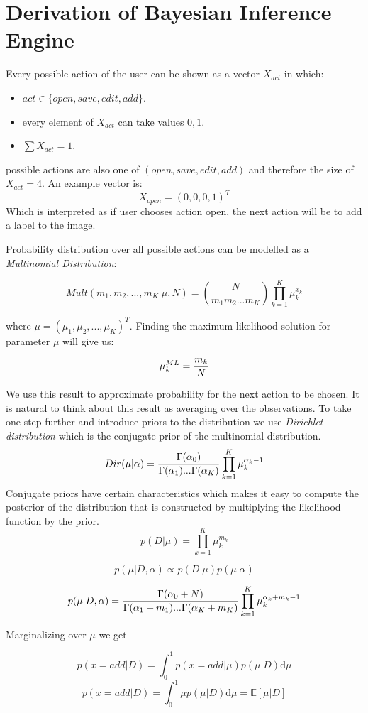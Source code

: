 \section{ Derivation of Bayesian Inference Engine}
Every possible action of the user can be shown as a vector $X_{act}$ in which:
\begin{itemize}
\item $act \in \{open, save, edit, add\}$.
\item every element of $X_{act}$ can take values $0,1$.
\item $\sum X_{act} =1$. 
\end{itemize}

possible actions are also one of $(open, save, edit, add)$ and therefore the size of $X_{act} = 4$. An example vector is:
\[ X_{open}=(0,0,0,1)^T \]
Which is interpreted as if user chooses action open, the next action will be to add a label to the image.


Probability distribution over all possible actions can be modelled as a \textit{Multinomial Distribution}:

\[
Mult(m_1,m_2,...,m_K|\mu,N)={N \choose m_1 m_2 ... m_K}\prod_{k=1}^K \mu_{k}^{x_k}
\]

where $\mu=(\mu_1,\mu_2,...,\mu_K)^T$. Finding the maximum likelihood solution for parameter $\mu$ will give us:

\[
\mu_k^{ML}={m_k \over N} 
\]

We use this result to approximate probability for the next action to be chosen. It is natural to think about this result as averaging over the observations.
To take one step further and introduce priors to the distribution we use \textit{Dirichlet distribution} which is the conjugate prior of the multinomial distribution.
\[
Dir(\mu|\alpha)={\Gamma(\alpha_0) \over \Gamma(\alpha_1)...\Gamma(\alpha_K)}\prod_{k=1}^K \mu_{k}^{\alpha_k -1}
\]
Conjugate priors have certain characteristics which makes it easy to compute the posterior of the distribution that is constructed by multiplying the likelihood function by the prior.  
\[
p(D|\mu)=\prod_{k=1}^K {\mu_{k}^{m_k}}\]

\[p(\mu| D,\alpha) \propto p(D|\mu)  p(\mu|\alpha)\]

\[p(\mu|D, \alpha)={\Gamma(\alpha_0+N) \over {\Gamma(\alpha_1+m_1)...\Gamma(\alpha_K+m_K)}}\prod_{k=1}^K \mu_{k}^{\alpha_k+m_k-1}\]

Marginalizing over $\mu$ we get 

\[p(x=add|D)=\int_0^1 p(x=add|\mu)p(\mu|D) \mathrm{d}\mu\]
\[p(x=add|D)=\int_0^1 \mu p(\mu|D)\mathrm{d}\mu = \mathbb{E}[\mu|D]\]

